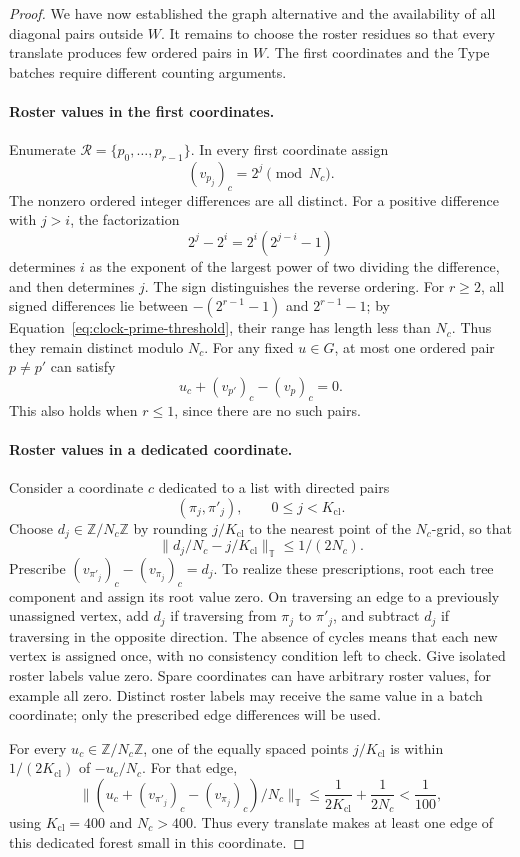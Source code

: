 \begin{proof}
We have now established the graph alternative and the availability of all
diagonal pairs outside $W$. It remains to choose the roster residues so
that every translate produces few ordered pairs in $W$. The first
coordinates and the Type batches require different counting arguments.

\paragraph{Roster values in the first coordinates.}
Enumerate $\mathcal R=\{p_0,\ldots,p_{r-1}\}$.  In every first
coordinate assign
\[
 (v_{p_j})_c=2^j\pmod{N_c}.
\]
The nonzero ordered integer differences are all distinct.  For a
positive difference with $j>i$, the factorization
\[
 2^j-2^i=2^i(2^{j-i}-1)
\]
determines $i$ as the exponent of the largest power of two dividing the difference,
and then determines $j$.  The sign distinguishes the reverse ordering.
For $r\ge2$, all signed differences lie between
$-(2^{r-1}-1)$ and $2^{r-1}-1$; by
Equation~\eqref{eq:clock-prime-threshold}, their range has length less than
$N_c$.  Thus they remain distinct modulo $N_c$.
For any fixed $u\in G$, at most one ordered pair $p\ne p'$ can satisfy
\[
 u_c+(v_{p'})_c-(v_p)_c=0.
\]
This also holds when $r\le1$, since there are no such pairs.

\paragraph{Roster values in a dedicated coordinate.}
Consider a coordinate $c$ dedicated to a list with directed pairs
\[
 (\pi_j,\pi'_j),\qquad 0\le j<K_{\mathrm{cl}}.
\]
Choose $d_j\in\mathbb Z/N_c\mathbb Z$ by rounding $j/K_{\mathrm{cl}}$
to the nearest point of the $N_c$-grid, so that
\[
 \|d_j/N_c-j/K_{\mathrm{cl}}\|_{\mathbb T}
 \le1/(2N_c).
\]
Prescribe $(v_{\pi'_j})_c-(v_{\pi_j})_c=d_j$.  To realize these prescriptions,
root each tree component and assign its root value zero.  On traversing
an edge to a previously unassigned vertex, add $d_j$ if traversing
from $\pi_j$ to $\pi'_j$, and subtract $d_j$ if traversing in the opposite
direction.  The absence of cycles means that each new vertex is
assigned once, with no consistency condition left to check.  Give
isolated roster labels value zero.  Spare coordinates can have arbitrary
roster values, for example all zero.  Distinct roster labels may receive
the same value in a batch coordinate; only the prescribed edge
differences will be used.

For every $u_c\in\mathbb Z/N_c\mathbb Z$, one of the equally spaced
points $j/K_{\mathrm{cl}}$ is within $1/(2K_{\mathrm{cl}})$ of
$-u_c/N_c$.  For that edge,
\begin{equation}
 \bigl\|(u_c+(v_{\pi'_j})_c-(v_{\pi_j})_c)/N_c\bigr\|_{\mathbb T}
 \le\frac1{2K_{\mathrm{cl}}}+\frac1{2N_c}
 <\frac1{100},
 \label{eq:clock-forest-net}
\end{equation}
using $K_{\mathrm{cl}}=400$ and $N_c>400$.  Thus every translate makes
at least one edge of this dedicated forest small in this coordinate.


\end{proof}
